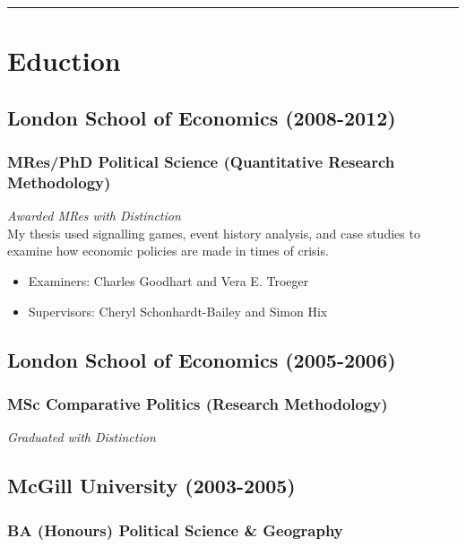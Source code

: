 \documentclass[a4paper]{article}
\begin{document}
{\vspace{0.25cm}
\medskip\hrule height 1pt
\vspace{0.5cm}


\section*{Eduction}

\subsection*{London School of Economics (2008-2012)}
\subsubsection*{MRes/PhD Political Science (Quantitative Research Methodology)}

\emph{Awarded MRes with Distinction} \\

\noindent My thesis used signalling games, event history analysis, and case studies to examine how economic policies are made in times of crisis.

\begin{itemize}
    \item Examiners: Charles Goodhart and Vera E. Troeger
    \item Supervisors: Cheryl Schonhardt-Bailey and Simon Hix
\end{itemize}

\subsection*{London School of Economics (2005-2006)}
\subsubsection*{MSc Comparative Politics (Research Methodology)}

{\emph{Graduated with Distinction}}

\subsection*{McGill University (2003-2005)}
\subsubsection*{BA (Honours) Political Science \& Geography}

}
\end{document}
